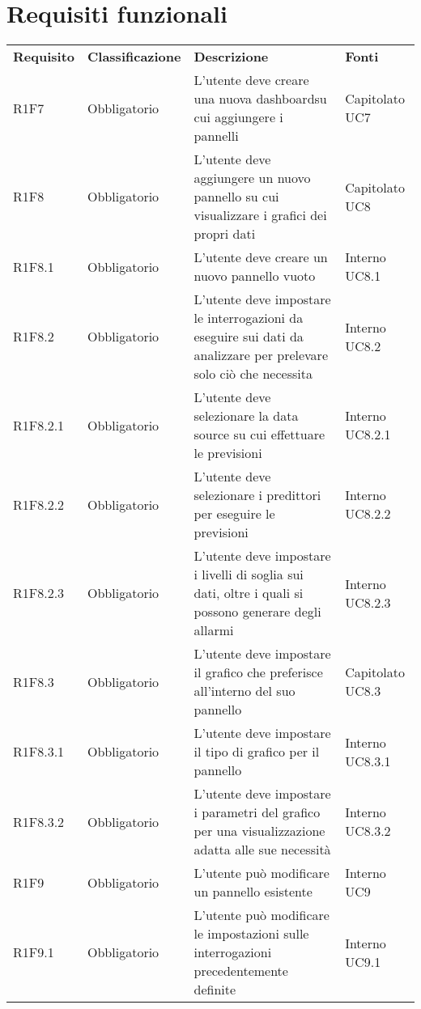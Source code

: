 \section{Requisiti funzionali}
	\begin{longtable} {
		>{}p{24mm} 
		>{}p{32mm}
		>{}p{40mm} 
		>{}p{24.5mm}
		}
	\rowcolor{gray!50}
		\textbf{Requisito} & \textbf{Classificazione} & \textbf{Descrizione} & \textbf{Fonti} 	\TBstrut \\
		R1F7 & Obbligatorio & L'utente deve creare una nuova dashboard\glosp su cui aggiungere i pannelli & Capitolato UC7 \TBstrut \\ [2mm]
		R1F8 & Obbligatorio & L'utente deve aggiungere un nuovo pannello su cui visualizzare i grafici dei propri dati & Capitolato UC8 \TBstrut \\ [2mm]
		R1F8.1 & Obbligatorio & L'utente deve creare un nuovo pannello vuoto & Interno UC8.1 \TBstrut \\ [2mm]
		R1F8.2 & Obbligatorio & L'utente deve impostare le interrogazioni da eseguire sui dati da analizzare per prelevare solo ciò che necessita & Interno UC8.2 \TBstrut \\ [2mm]
		R1F8.2.1 & Obbligatorio & L'utente deve selezionare la data source su cui effettuare le previsioni & Interno UC8.2.1 \TBstrut \\ [2mm]
		R1F8.2.2 & Obbligatorio & L'utente deve selezionare i predittori per eseguire le previsioni & Interno UC8.2.2 \TBstrut \\ [2mm]
		R1F8.2.3 & Obbligatorio & L'utente deve impostare i livelli di soglia sui dati, oltre i quali si possono generare degli allarmi & Interno UC8.2.3 \TBstrut \\ [2mm]
		R1F8.3 & Obbligatorio & L'utente deve impostare il grafico che preferisce all'interno del suo pannello & Capitolato UC8.3 \TBstrut \\ [2mm]
		R1F8.3.1 & Obbligatorio & L'utente deve impostare il tipo di grafico per il pannello & Interno UC8.3.1 \TBstrut \\ [2mm]
		R1F8.3.2 & Obbligatorio & L'utente deve impostare i parametri del grafico per una visualizzazione adatta alle sue necessità & Interno UC8.3.2 \TBstrut \\ [2mm]
		R1F9 & Obbligatorio & L'utente può modificare un pannello esistente & Interno UC9 \TBstrut \\ [2mm]
		R1F9.1 & Obbligatorio & L'utente può modificare le impostazioni sulle interrogazioni precedentemente definite & Interno UC9.1 \TBstrut \\ [2mm]

\end{longtable}
